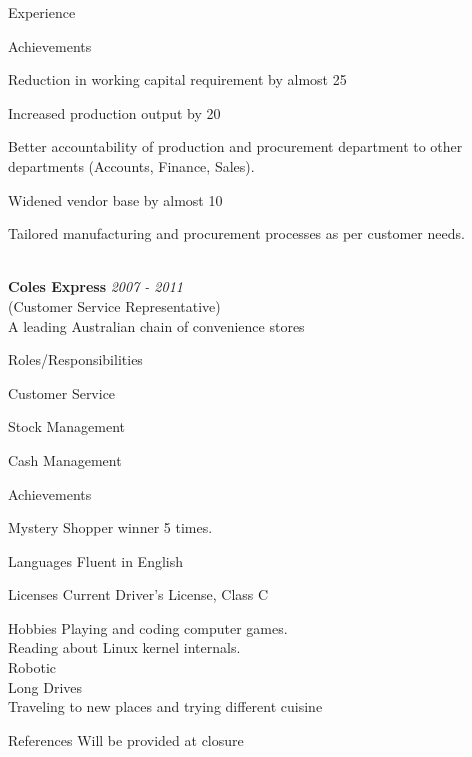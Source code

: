 \documentclass{resume}
\begin{document}
\begin{rSection}{Experience}
\begin{rSubsection}{Achievements}{}{}{}
\item Reduction in working capital requirement by almost 25%
\item Increased production output by 20%
\item Better accountability of production and procurement department to other departments (Accounts, Finance, Sales).
\item Widened vendor base by almost 10%
\item Tailored manufacturing and procurement processes as per customer needs.\\\\
\end{rSubsection}

{\bf Coles Express} \hfill {\em  2007 - 2011} 
\\ (Customer Service Representative)
\\ A leading Australian chain of convenience stores

\begin{rSubsection}{Roles/Responsibilities}{}{}{}   
 \item Customer Service
 \item Stock Management
 \item Cash Management
\end{rSubsection}

\begin{rSubsection}{Achievements}{}{}{}
 \item Mystery Shopper winner 5 times.
\end{rSubsection}
\end{rSection}

\begin{rSection}{Languages}
 Fluent in English
\end{rSection}

\begin{rSection}{Licenses}
Current Driver’s License, Class C
\end{rSection}

\begin{rSection}{Hobbies}
Playing and coding computer games.\\
Reading about Linux kernel internals.\\
Robotic\\
Long Drives\\
Traveling to new places and trying different cuisine\\
\end{rSection}


\begin{rSection}{References}
Will be provided at closure
\end{rSection}
\end{document}
